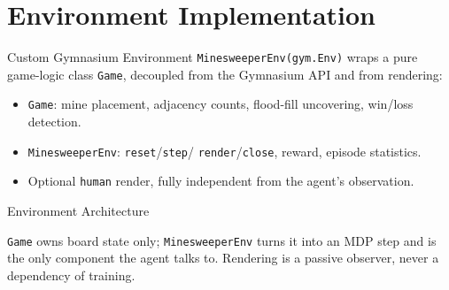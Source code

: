 
\section{Environment Implementation}

\begin{frame}{Custom Gymnasium Environment}
  \texttt{MinesweeperEnv(gym.Env)} wraps a pure game-logic class
  \texttt{Game}, decoupled from the Gymnasium API and from rendering:
  \begin{itemize}
    \item \texttt{Game}: mine placement, adjacency counts, flood-fill
      uncovering, win/loss detection.
    \item \texttt{MinesweeperEnv}: \texttt{reset}/\texttt{step}/
      \texttt{render}/\texttt{close}, reward, episode statistics.
    \item Optional \texttt{human} render, fully independent from the
      agent's observation.
  \end{itemize}
\end{frame}

\begin{frame}{Environment Architecture}
  \centering
  \vspace{0.4cm}
  \vspace{0.5cm}

  \small \texttt{Game} owns board state only; \texttt{MinesweeperEnv}
  turns it into an MDP step and is the only component the agent talks
  to. Rendering is a passive observer, never a dependency of training.
\end{frame}

